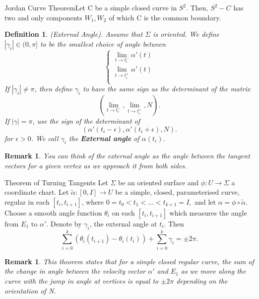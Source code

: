 \documentclass[twoside]{article}
\newtheorem{definition}[theorem]{Definition}
\newtheorem{remark}[theorem]{Remark}
\begin{document}
\begin{theorem_exam}{Jordan Curve Theorem}{}Let C be a simple closed curve in $S^2.$ Then, $S^2-C$ has two and only components $W_1, W_2$ of which C is the common boundary.
\end{theorem_exam}
\begin{definition}(External Angle). Assume that $\Sigma$ is oriented. We define $|\gamma_i| \in (0, \pi]$ to be the smallest choice of angle between 
$$
\begin{cases}
\lim_{t \rightarrow t_{i}^{-}}\alpha'(t)\\
\lim_{t \rightarrow t_{i}^{+}}\alpha'(t)\\
\end{cases}
$$
If $|\gamma_i| \neq \pi$, then define $\gamma_i$ to have the same sign as the determinant of the matrix 
$$
(\lim_{t \rightarrow t_{i}^{-}},\lim_{t \rightarrow t_{i}^{+}}, N).
$$
If $|\gamma| = \pi$, use the sign of the determinant of 
$$
(\alpha'(t_i - \epsilon), \alpha'(t_i + \epsilon), N).
$$
for $\epsilon > 0$. We call $\gamma_i$ the \textbf{External angle} of $\alpha(t_i)$.
\end{definition}

\begin{remark}You can think of the external angle as the angle between the tangent vectors for a given vertex as we approach it from both sides.
\end{remark}


\begin{theorem_exam}{Theorem of Turning Tangents}{} Let $\Sigma$ be an oriented surface and $\phi: U \rightarrow \Sigma$ a coordinate chart. Let $\tilde{\alpha}: [0,I] \rightarrow U$ be a simple, closed, parameterised curve, regular in each $[t_i, t_{i+1}]$, where $0 = t_0 < t_1 < ... < t_{k+1} = I,$ and let $\alpha = \phi \circ \tilde{\alpha}.$\\
Choose a smooth angle function $\theta_i$ on each $[t_i, t_{i+1}]$ which measures the angle from $E_1$ to $\alpha'.$ Denote by $\gamma_i$, the external angle at $t_i.$ Then 
$$
\sum_{i=0}^{k}(\theta_i(t_{i+1}) - \theta_i(t_i)) + \sum_{i=0}^{k}\gamma_i = \pm 2\pi.
$$
\end{theorem_exam}
\begin{remark}This theorem states that for a simple closed regular curve, the sum of the change in angle between the velocity vector $\alpha'$ and $E_1$ as we move along the curve with the jump in angle at vertices is equal to $\pm 2\pi$ depending on the orientation of N.
\end{remark}
\end{document}

